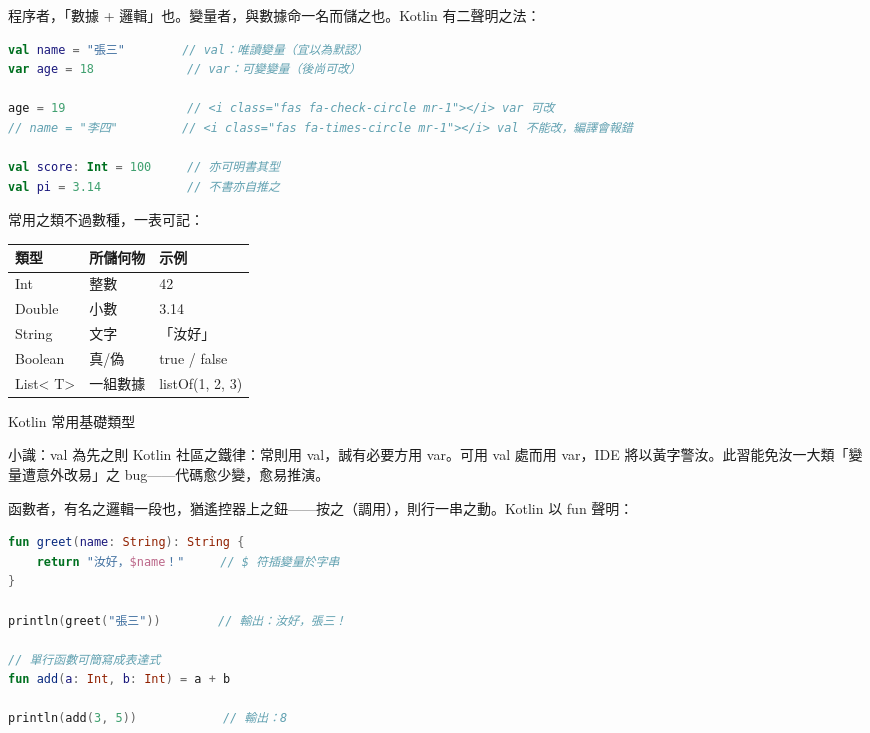 


程序者，「數據 + 邏輯」也。變量者，與數據命一名而儲之也。Kotlin 有二聲明之法：

\begin{lstlisting}[language=Kotlin]
val name = "張三"        // val：唯讀變量（宜以為默認）
var age = 18             // var：可變變量（後尚可改）

age = 19                 // <i class="fas fa-check-circle mr-1"></i> var 可改
// name = "李四"         // <i class="fas fa-times-circle mr-1"></i> val 不能改，編譯會報錯

val score: Int = 100     // 亦可明書其型
val pi = 3.14            // 不書亦自推之
\end{lstlisting}

常用之類不過數種，一表可記：

\begin{center}
\begin{tabularx}{\linewidth}{|X|X|X|}
\hline
\textbf{類型} & \textbf{所儲何物} & \textbf{示例} \tabularnewline
\hline
Int & 整數 & 42 \tabularnewline
Double & 小數 & 3.14 \tabularnewline
String & 文字 & 「汝好」 \tabularnewline
Boolean & 真/偽 & true / false \tabularnewline
List< T> & 一組數據 & listOf(1, 2, 3) \tabularnewline
\hline
\end{tabularx}
\end{center}

\begin{center}\small\color{gray}Kotlin 常用基礎類型\end{center}

\begin{tcbinfo}{小識：val 為先之則}
Kotlin 社區之鐵律：常則用 val，誠有必要方用 var。可用 val 處而用 var，IDE 將以黃字警汝。此習能免汝一大類「變量遭意外改易」之 bug——代碼愈少變，愈易推演。

\end{tcbinfo}


函數者，有名之邏輯一段也，猶遙控器上之鈕——按之（調用），則行一串之動。Kotlin 以 fun 聲明：

\begin{lstlisting}[language=Kotlin]
fun greet(name: String): String {
    return "汝好，$name！"     // $ 符插變量於字串
}

println(greet("張三"))        // 輸出：汝好，張三！

// 單行函數可簡寫成表達式
fun add(a: Int, b: Int) = a + b

println(add(3, 5))            // 輸出：8
\end{lstlisting}

